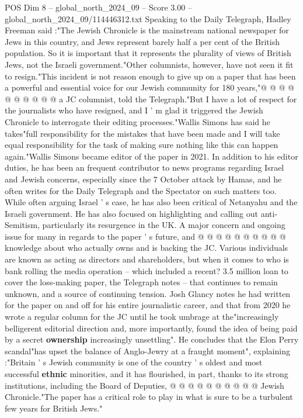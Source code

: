 \begin{textsample}{POS Dim 8 – global\_north\_2024\_09 – Score 3.00 – global\_north\_2024\_09/114446312.txt}
Speaking to the Daily Telegraph, Hadley Freeman said :"The Jewish Chronicle is the mainstream national newspaper for Jews in this country, and Jews represent barely half a per cent of the British population.
So it is important that it represents the plurality of views of British Jews, not the Israeli government."Other columnists, however, have not seen it fit to resign."This incident is not reason enough to give up on a paper that has been a powerful and essential voice for our Jewish community for 180 years,"@ @ @ @ @ @ @ @ @ @ a JC columnist, told the Telegraph."But I have a lot of respect for the journalists who have resigned, and I ' m glad it triggered the Jewish Chronicle to interrogate their editing processes."Wallis Simons has said he takes"full responsibility for the mistakes that have been made and I will take equal responsibility for the task of making sure nothing like this can happen again."Wallis Simons became editor of the paper in 2021.
In addition to his editor duties, he has been an frequent contributor to news programs regarding Israel and Jewish concerns, especially since the 7 October attack by Hamas, and he often writes for the Daily Telegraph and the Spectator on such matters too.
While often arguing Israel ' s case, he has also been critical of Netanyahu and the Israeli government.
He has also focused on highlighting and calling out anti-Semitism, particularly its resurgence in the UK.
A major concern and ongoing issue for many in regards to the paper ' s future, and @ @ @ @ @ @ @ @ @ @ knowledge about who actually owns and is backing the JC.
Various individuals are known as acting as directors and shareholders, but when it comes to who is bank rolling the media operation -- which included a recent? 3.5 million loan to cover the loss-making paper, the Telegraph notes -- that continues to remain unknown, and a source of continuing tension.
Josh Glancy notes he had written for the paper on and off for his entire journalistic career, and that from 2020 he wrote a regular column for the JC until he took umbrage at the"increasingly belligerent editorial direction and, more importantly, found the idea of being paid by a secret \textbf{ownership} increasingly unsettling".
He concludes that the Elon Perry scandal"has upset the balance of Anglo-Jewry at a fraught moment", explaining :"Britain ' s Jewish community is one of the country ' s oldest and most successful \textbf{ethnic} minorities, and it has flourished, in part, thanks to its strong institutions, including the Board of Deputies, @ @ @ @ @ @ @ @ @ @ Jewish Chronicle."The paper has a critical role to play in what is sure to be a turbulent few years for British Jews."

\end{textsample}
